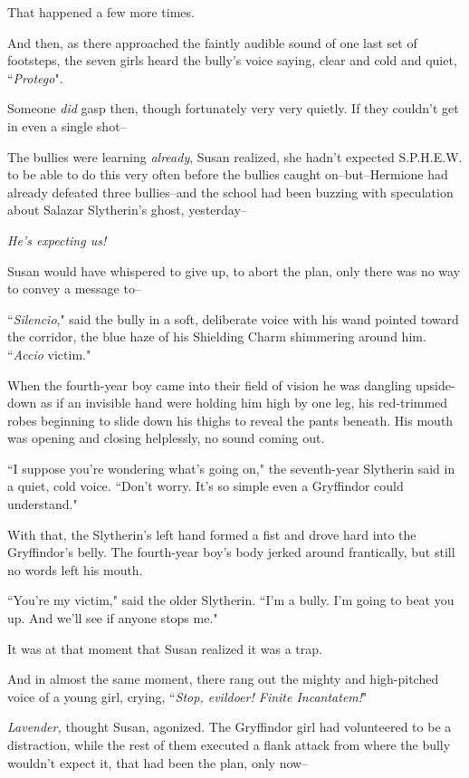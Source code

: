 That happened a few more times.

And then, as there approached the faintly audible sound of one last set of footsteps, the seven girls heard the bully's voice saying, clear and cold and quiet, ``\emph{Protego}".

Someone \emph{did} gasp then, though fortunately very very quietly. If they couldn't get in even a single shot\---

The bullies were learning \emph{already}, Susan realized, she hadn't expected S.P.H.E.W. to be able to do this very often before the bullies caught on\---but\---Hermione had already defeated three bullies\---and the school had been buzzing with speculation about Salazar Slytherin's ghost, yesterday\---

\emph{He's expecting us!}

Susan would have whispered to give up, to abort the plan, only there was no way to convey a message to\---

``\emph{Silencio}," said the bully in a soft, deliberate voice with his wand pointed toward the corridor, the blue haze of his Shielding Charm shimmering around him. ``\emph{Accio} victim."

When the fourth-year boy came into their field of vision he was dangling upside-down as if an invisible hand were holding him high by one leg, his red-trimmed robes beginning to slide down his thighs to reveal the pants beneath. His mouth was opening and closing helplessly, no sound coming out.

``I suppose you're wondering what's going on," the seventh-year Slytherin said in a quiet, cold voice. ``Don't worry. It's so simple even a Gryffindor could understand."

With that, the Slytherin's left hand formed a fist and drove hard into the Gryffindor's belly. The fourth-year boy's body jerked around frantically, but still no words left his mouth.

``You're my victim," said the older Slytherin. ``I'm a bully. I'm going to beat you up. And we'll see if anyone stops me."

It was at that moment that Susan realized it was a trap.

And in almost the same moment, there rang out the mighty and high-pitched voice of a young girl, crying, ``\emph{Stop, evildoer! Finite Incantatem!}"

\emph{Lavender,} thought Susan, agonized. The Gryffindor girl had volunteered to be a distraction, while the rest of them executed a flank attack from where the bully wouldn't expect it, that had been the plan, only now\---

